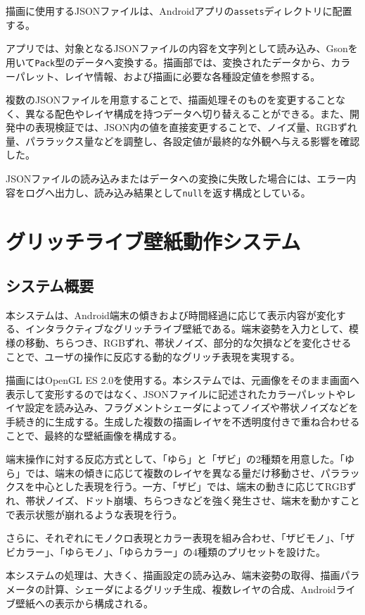 描画に使用するJSONファイルは、Androidアプリの\texttt{assets}ディレクトリに配置する。

アプリでは、対象となるJSONファイルの内容を文字列として読み込み、Gsonを用いて\texttt{Pack}型のデータへ変換する。描画部では、変換されたデータから、カラーパレット、レイヤ情報、および描画に必要な各種設定値を参照する。

複数のJSONファイルを用意することで、描画処理そのものを変更することなく、異なる配色やレイヤ構成を持つデータへ切り替えることができる。また、開発中の表現検証では、JSON内の値を直接変更することで、ノイズ量、RGBずれ量、パララックス量などを調整し、各設定値が最終的な外観へ与える影響を確認した。

JSONファイルの読み込みまたはデータへの変換に失敗した場合には、エラー内容をログへ出力し、読み込み結果として\texttt{null}を返す構成としている。
\chapter{グリッチライブ壁紙動作システム}

\section{システム概要}

本システムは、Android端末の傾きおよび時間経過に応じて表示内容が変化する、インタラクティブなグリッチライブ壁紙である。端末姿勢を入力として、模様の移動、ちらつき、RGBずれ、帯状ノイズ、部分的な欠損などを変化させることで、ユーザの操作に反応する動的なグリッチ表現を実現する。

描画にはOpenGL ES 2.0を使用する。本システムでは、元画像をそのまま画面へ表示して変形するのではなく、JSONファイルに記述されたカラーパレットやレイヤ設定を読み込み、フラグメントシェーダによってノイズや帯状ノイズなどを手続き的に生成する。生成した複数の描画レイヤを不透明度付きで重ね合わせることで、最終的な壁紙画像を構成する。

端末操作に対する反応方式として、「ゆら」と「ザビ」の2種類を用意した。「ゆら」では、端末の傾きに応じて複数のレイヤを異なる量だけ移動させ、パララックスを中心とした表現を行う。一方、「ザビ」では、端末の動きに応じてRGBずれ、帯状ノイズ、ドット崩壊、ちらつきなどを強く発生させ、端末を動かすことで表示状態が崩れるような表現を行う。

さらに、それぞれにモノクロ表現とカラー表現を組み合わせ、「ザビモノ」、「ザビカラー」、「ゆらモノ」、「ゆらカラー」の4種類のプリセットを設けた。

本システムの処理は、大きく、描画設定の読み込み、端末姿勢の取得、描画パラメータの計算、シェーダによるグリッチ生成、複数レイヤの合成、Androidライブ壁紙への表示から構成される。


